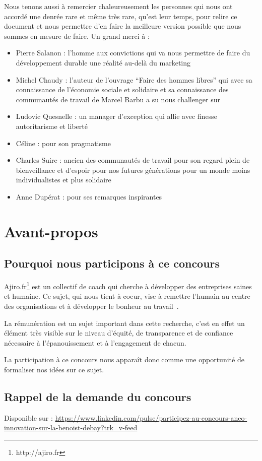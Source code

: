 \documentclass[12pt]{article}
\begin{document}
Nous tenons aussi à remercier chaleureusement les personnes qui nous ont accordé une denrée rare et même très rare, qu’est leur temps, pour relire ce document et nous permettre d’en faire la meilleure version possible que nous sommes en mesure de faire. Un grand merci à :
\begin{itemize}
  \item Pierre Salanon : l’homme aux convictions qui va nous permettre de faire du développement durable une réalité au-delà du marketing
  \item Michel Chaudy : l’auteur de l’ouvrage “Faire des hommes libres” qui avec sa connaissance de l’économie sociale et solidaire et sa connaissance des communautés de travail de Marcel Barbu a su nous challenger sur 
  \item Ludovic Quesnelle : un manager d’exception qui allie avec finesse autoritarisme et liberté
  \item Céline : pour son pragmatisme
  \item Charles Suire : ancien des communautés de travail pour son regard plein de bienveillance et d’espoir pour nos futures générations pour un monde moins individualistes et plus solidaire
  \item Anne Dupérat : pour ses remarques inspirantes
\end{itemize}


\section{Avant-propos}
\subsection{Pourquoi nous participons à ce concours}
 Ajiro.fr\footnote{http://ajiro.fr} est un collectif de coach qui cherche à développer des entreprises saines et humaine. Ce sujet, qui nous tient à coeur, vise à remettre l’humain au centre des organisations et à développer le bonheur au travail~\cite{Getz, Laloux}.

 La rémunération est un sujet important dans cette recherche, c’est en effet un élément très visible sur le niveau d’équité, de transparence et de confiance nécessaire à l'épanouissement et à l’engagement de chacun.

 La participation à ce concours nous apparaît donc comme une opportunité de formaliser nos idées sur ce sujet.

\subsection{Rappel de la demande du concours}
 Disponible sur : \url{https://www.linkedin.com/pulse/participez-au-concours-aneo-innovation-sur-la-benoist-debay?trk=v-feed}
\end{document}
